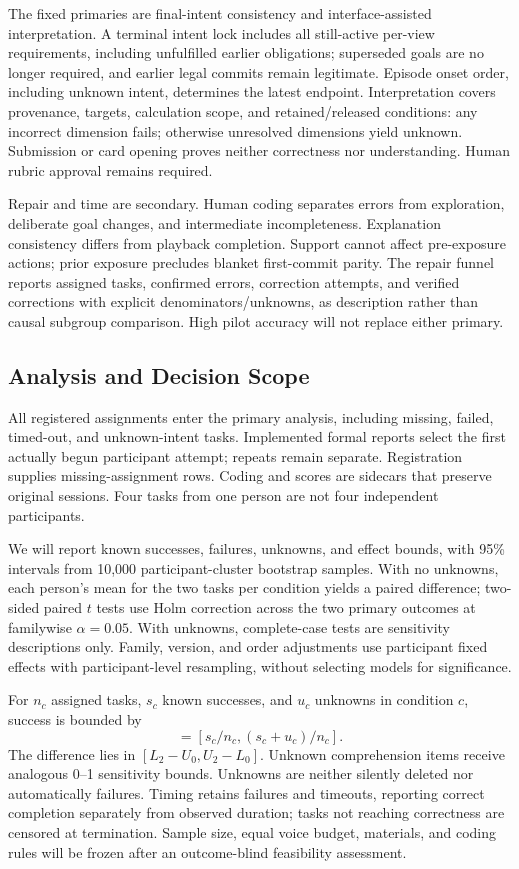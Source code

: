 \documentclass[conference,10pt,letterpaper]{IEEEtran}
\begin{document}
The fixed primaries are final-intent consistency and interface-assisted interpretation. A terminal intent lock includes all still-active per-view requirements, including unfulfilled earlier obligations; superseded goals are no longer required, and earlier legal commits remain legitimate. Episode onset order, including unknown intent, determines the latest endpoint. Interpretation covers provenance, targets, calculation scope, and retained/released conditions: any incorrect dimension fails; otherwise unresolved dimensions yield unknown. Submission or card opening proves neither correctness nor understanding. Human rubric approval remains required.

Repair and time are secondary. Human coding separates errors from exploration, deliberate goal changes, and intermediate incompleteness. Explanation consistency differs from playback completion. Support cannot affect pre-exposure actions; prior exposure precludes blanket first-commit parity. The repair funnel reports assigned tasks, confirmed errors, correction attempts, and verified corrections with explicit denominators/unknowns, as description rather than causal subgroup comparison. High pilot accuracy will not replace either primary.

\subsection{Analysis and Decision Scope}
All registered assignments enter the primary analysis, including missing, failed, timed-out, and unknown-intent tasks. Implemented formal reports select the first actually begun participant attempt; repeats remain separate. Registration supplies missing-assignment rows. Coding and scores are sidecars that preserve original sessions. Four tasks from one person are not four independent participants.

We will report known successes, failures, unknowns, and effect bounds, with 95\% intervals from 10,000 participant-cluster bootstrap samples. With no unknowns, each person's mean for the two tasks per condition yields a paired difference; two-sided paired $t$ tests use Holm correction across the two primary outcomes at familywise $\alpha=0.05$. With unknowns, complete-case tests are sensitivity descriptions only. Family, version, and order adjustments use participant fixed effects with participant-level resampling, without selecting models for significance.

For $n_c$ assigned tasks, $s_c$ known successes, and $u_c$ unknowns in condition $c$, success is bounded by
\begin{equation}
[L_c,U_c]=[s_c/n_c,(s_c+u_c)/n_c].
\end{equation}
The difference lies in $[L_2-U_0,U_2-L_0]$. Unknown comprehension items receive analogous 0--1 sensitivity bounds. Unknowns are neither silently deleted nor automatically failures. Timing retains failures and timeouts, reporting correct completion separately from observed duration; tasks not reaching correctness are censored at termination. Sample size, equal voice budget, materials, and coding rules will be frozen after an outcome-blind feasibility assessment.
\end{document}
